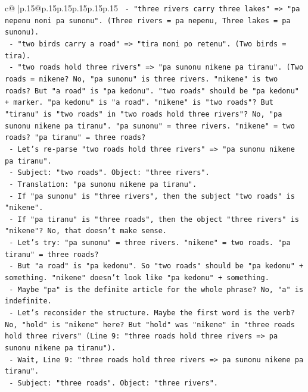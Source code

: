 \documentclass{article}
\begin{document}
{\begin{supertabular}{c@{$\;$}|p{.15\linewidth}@{}p{.15\linewidth}p{.15\linewidth}p{.15\linewidth}p{.15\linewidth}p{.15\linewidth}}
{{{\texttt{             {-} "three rivers carry three lakes" => "pa nepenu noni pa sunonu". (Three rivers = pa nepenu, Three lakes = pa sunonu).} \\
\texttt{             {-} "two birds carry a road" => "tira noni po retenu". (Two birds = tira).} \\
\texttt{             {-} "two roads hold three rivers" => "pa sunonu nikene pa tiranu". (Two roads = nikene? No, "pa sunonu" is three rivers. "nikene" is two roads? But "a road" is "pa kedonu". "two roads" should be "pa kedonu" + marker. "pa kedonu" is "a road". "nikene" is "two roads"? But "tiranu" is "two roads" in "two roads hold three rivers"? No, "pa sunonu nikene pa tiranu". "pa sunonu" = three rivers. "nikene" = two roads? "pa tiranu" = three roads?} \\
\texttt{             {-} Let's re{-}parse "two roads hold three rivers" => "pa sunonu nikene pa tiranu".} \\
\texttt{               {-} Subject: "two roads". Object: "three rivers".} \\
\texttt{               {-} Translation: "pa sunonu nikene pa tiranu".} \\
\texttt{               {-} If "pa sunonu" is "three rivers", then the subject "two roads" is "nikene".} \\
\texttt{               {-} If "pa tiranu" is "three roads", then the object "three rivers" is "nikene"? No, that doesn't make sense.} \\
\texttt{               {-} Let's try: "pa sunonu" = three rivers. "nikene" = two roads. "pa tiranu" = three roads?} \\
\texttt{               {-} But "a road" is "pa kedonu". So "two roads" should be "pa kedonu" + something. "nikene" doesn't look like "pa kedonu" + something.} \\
\texttt{               {-} Maybe "pa" is the definite article for the whole phrase? No, "a" is indefinite.} \\
\texttt{               {-} Let's reconsider the structure. Maybe the first word is the verb? No, "hold" is "nikene" here? But "hold" was "nikene" in "three roads hold three rivers" (Line 9: "three roads hold three rivers => pa sunonu nikene pa tiranu").} \\
\texttt{               {-} Wait, Line 9: "three roads hold three rivers => pa sunonu nikene pa tiranu".} \\
\texttt{                 {-} Subject: "three roads". Object: "three rivers".} \\
}}}
\end{supertabular}}
\end{document}

